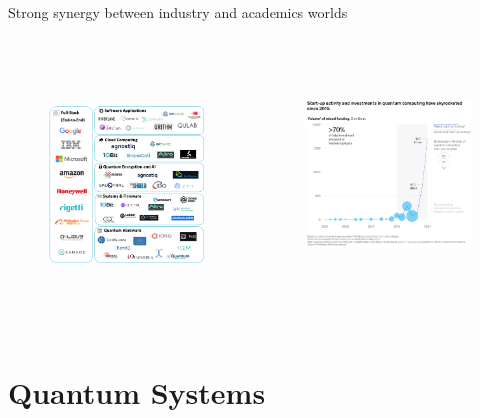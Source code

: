 \documentclass[aspectratio=169, 8pt, xcolor={svgnames}, hyperref={linkcolor=black}]{beamer}
\begin{document}
 \begin{frame}[fragile]{Strong synergy between industry and academics worlds}

     \begin{columns}
         \column{7cm}
     \begin{figure}
         \includegraphics[height=7cm]{figures/companies.png}
     \end{figure}
     \column{7cm}
     \begin{figure}
         \includegraphics[height=6.5cm]{figures/startup.png}
     \end{figure}
     \end{columns}
 \end{frame}

\section{Quantum Systems}
\end{document}
